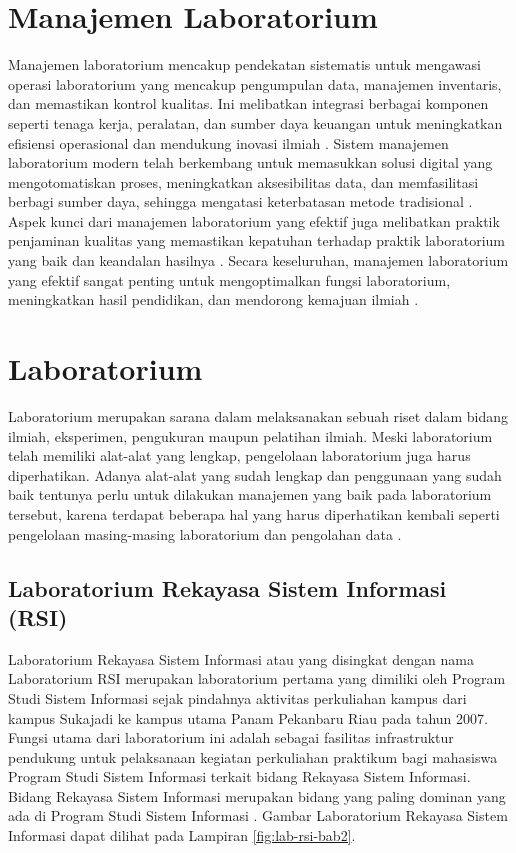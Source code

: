 \section{Manajemen Laboratorium}
Manajemen laboratorium mencakup pendekatan sistematis untuk mengawasi operasi laboratorium yang mencakup pengumpulan data, manajemen inventaris, dan memastikan kontrol kualitas. Ini melibatkan integrasi berbagai komponen seperti tenaga kerja, peralatan, dan sumber daya keuangan untuk meningkatkan efisiensi operasional dan mendukung inovasi ilmiah \cite{marwah2024sistem}. Sistem manajemen laboratorium modern telah berkembang untuk memasukkan solusi digital yang mengotomatiskan proses, meningkatkan aksesibilitas data, dan memfasilitasi berbagi sumber daya, sehingga mengatasi keterbatasan metode tradisional \cite{rihm2024digital}. Aspek kunci dari manajemen laboratorium yang efektif juga melibatkan praktik penjaminan kualitas yang memastikan kepatuhan terhadap praktik laboratorium yang baik dan keandalan hasilnya \cite{kawai2021phase}. Secara keseluruhan, manajemen laboratorium yang efektif sangat penting untuk mengoptimalkan fungsi laboratorium, meningkatkan hasil pendidikan, dan mendorong kemajuan ilmiah \cite{marwah2024sistem}.

\section{Laboratorium}
Laboratorium merupakan sarana dalam melaksanakan sebuah riset dalam bidang ilmiah, eksperimen, pengukuran maupun pelatihan ilmiah. Meski laboratorium telah memiliki alat-alat yang lengkap, pengelolaan laboratorium juga harus diperhatikan. Adanya alat-alat yang sudah lengkap dan penggunaan yang sudah baik tentunya perlu untuk dilakukan manajemen yang baik pada laboratorium tersebut, karena terdapat beberapa hal yang harus diperhatikan kembali seperti pengelolaan masing-masing laboratorium dan pengolahan data \cite{sweden2022rancang}.

\subsection{Laboratorium Rekayasa Sistem Informasi (RSI)}
Laboratorium Rekayasa Sistem Informasi atau yang disingkat dengan nama Laboratorium RSI merupakan laboratorium pertama yang dimiliki oleh Program Studi Sistem Informasi sejak pindahnya aktivitas perkuliahan kampus dari kampus Sukajadi ke kampus utama Panam Pekanbaru Riau pada tahun 2007. Fungsi utama dari laboratorium ini adalah sebagai fasilitas infrastruktur pendukung untuk pelaksanaan kegiatan perkuliahan praktikum bagi mahasiswa Program Studi Sistem Informasi terkait bidang Rekayasa Sistem Informasi. Bidang Rekayasa Sistem Informasi merupakan bidang yang paling dominan yang ada di Program Studi Sistem Informasi \cite{labsi2023}. Gambar Laboratorium Rekayasa Sistem Informasi dapat dilihat pada Lampiran \ref{fig:lab-rsi-bab2}.

